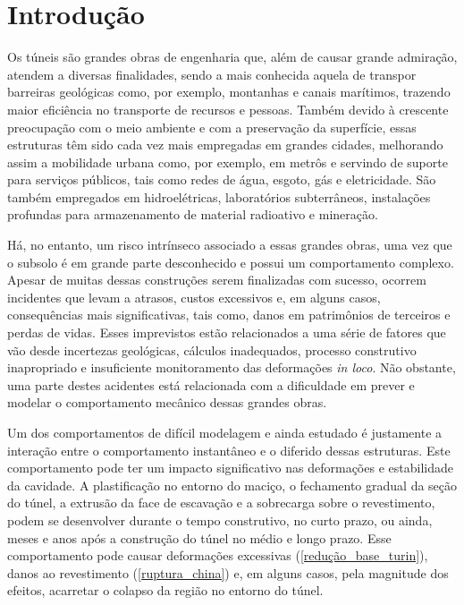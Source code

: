 \chapter{Introdução}\label{introducao}

Os túneis são grandes obras de engenharia que, além de causar grande admiração, atendem a diversas finalidades, sendo a mais conhecida aquela de transpor barreiras geológicas como, por exemplo, montanhas e canais marítimos, trazendo maior eficiência no transporte de recursos e pessoas. Também devido à crescente preocupação com o meio ambiente e com a preservação da superfície, essas estruturas têm sido cada vez mais empregadas em grandes cidades, melhorando assim a mobilidade urbana como, por exemplo, em metrôs e servindo de suporte para serviços públicos, tais como redes de água, esgoto, gás e eletricidade. São também empregados em hidroelétricas, laboratórios subterrâneos, instalações profundas para armazenamento de material radioativo e mineração.

Há, no entanto, um risco intrínseco associado a essas grandes obras, uma vez que o subsolo é em grande parte desconhecido e possui um comportamento complexo. Apesar de muitas dessas construções serem finalizadas com sucesso, ocorrem incidentes que levam a atrasos, custos excessivos e, em alguns casos, consequências mais significativas, tais como, danos em patrimônios de terceiros e perdas de vidas. Esses imprevistos estão relacionados a uma série de fatores que vão desde incertezas geológicas, cálculos inadequados, processo construtivo inapropriado e insuficiente monitoramento das deformações \textit{in loco}. Não obstante, uma parte destes acidentes está relacionada com a dificuldade em prever e modelar o comportamento mecânico dessas grandes obras.

Um dos comportamentos de difícil modelagem e ainda estudado é justamente a interação entre o comportamento instantâneo e o diferido dessas estruturas. Este comportamento pode ter um impacto significativo nas deformações e estabilidade da cavidade. A plastificação no entorno do maciço, o fechamento gradual da seção do túnel, a extrusão da face de escavação e a sobrecarga sobre o revestimento, podem se desenvolver durante o tempo construtivo, no curto prazo, ou ainda, meses e anos após a construção do túnel no médio e longo prazo. Esse comportamento pode causar deformações excessivas (\autoref{redução_base_turin}), danos ao revestimento (\autoref{ruptura_china}) e, em alguns casos, pela magnitude dos efeitos, acarretar o colapso da região no entorno do túnel.

